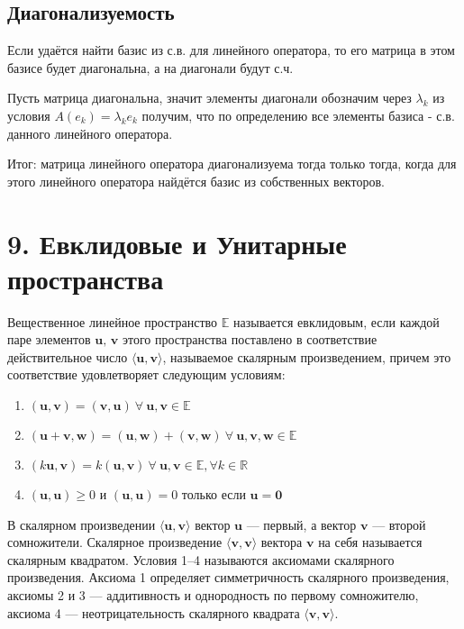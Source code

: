\documentclass[12pt]{article}
\begin{document}
\subsection{Диагонализуемость}

Если удаётся найти базис из с.в. для линейного оператора, то его матрица в этом базисе будет диагональна, а на диагонали будут с.ч.

Пусть матрица диагональна, значит элементы диагонали обозначим через $\lambda_k$ из условия $A(e_k) = \lambda_k e_k$ получим, что по определению все элементы базиса - с.в. данного линейного оператора.

Итог: матрица линейного оператора диагонализуема тогда только тогда, когда для этого линейного оператора найдётся базис из собственных векторов.

\section{9. Евклидовые и Унитарные пространства}
Вещественное линейное пространство $\mathbb{E}$ называется евклидовым, если каждой паре элементов $\mathbf{u},\,\mathbf{v}$ этого пространства поставлено в соответствие действительное число $\langle \mathbf{u},\mathbf{v} \rangle$, называемое скалярным произведением, причем это соответствие удовлетворяет следующим условиям:
\begin{enumerate}
    \item $(\mathbf{u},\mathbf{v})=(\mathbf{v},\mathbf{u})\ \forall\ \mathbf{u},\mathbf{v}\in \mathbb{E}$
    \item $(\mathbf{u} + \mathbf{v},\mathbf{w})=(\mathbf{u},\mathbf{w})+(\mathbf{v},\mathbf{w})\ \forall\ \mathbf{u},\mathbf{v},\mathbf{w}\in \mathbb{E}$
    \item $(k\mathbf{u},\mathbf{v})=k(\mathbf{u},\mathbf{v})\ \forall\ \mathbf{u},\mathbf{v}\in \mathbb{E},\forall k\in \mathbb{R}$
    \item $(\mathbf{u},\mathbf{u})\geq 0$ и $(\mathbf{u},\mathbf{u})=0$ только если $\mathbf{u}=\mathbf{0}$
\end{enumerate}
В скалярном произведении $\langle\mathbf{u}, \mathbf{v}\rangle$ вектор $\mathbf{u}$ — первый, а вектор $\mathbf{v}$ — второй сомножители. Скалярное произведение $\langle\mathbf{v},\mathbf{v}\rangle$ вектора $\mathbf{v}$ на себя называется скалярным квадратом. Условия 1–4 называются аксиомами скалярного произведения. Аксиома 1 определяет симметричность скалярного произведения, аксиомы 2 и 3 — аддитивность и однородность по первому сомножителю, аксиома 4 — неотрицательность скалярного квадрата $\langle\mathbf{v}, \mathbf{v}\rangle$.
\end{document}
